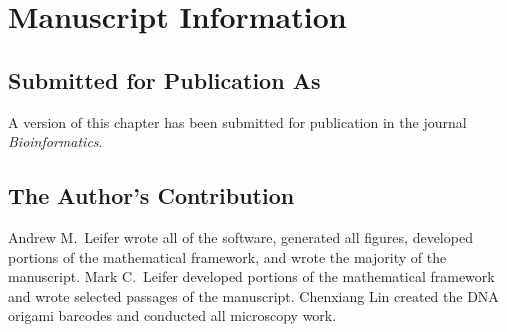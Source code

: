 \section{Manuscript Information}
\subsection{Submitted for Publication As}
A version of this chapter has been submitted for publication in the journal \textit{Bioinformatics}.

\subsection{The Author's Contribution}
Andrew M.~Leifer wrote all of the software, generated all figures, developed portions of the mathematical framework, and wrote the majority of the manuscript. Mark C.~Leifer developed portions of the mathematical framework and wrote selected passages of the manuscript. Chenxiang Lin created the DNA origami barcodes and conducted all microscopy work. 
 
